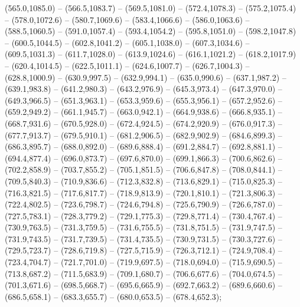 (565.0,1085.0) -- (566.5,1083.7) -- (569.5,1081.0) -- (572.4,1078.3) -- (575.2,1075.4) -- (578.0,1072.6) -- (580.7,1069.6) -- (583.4,1066.6) -- (586.0,1063.6) -- (588.5,1060.5) -- (591.0,1057.4) -- (593.4,1054.2) -- (595.8,1051.0) -- (598.2,1047.8) -- (600.5,1044.5) -- (602.8,1041.2) -- (605.1,1038.0) -- (607.3,1034.6) -- (609.5,1031.3) -- (611.7,1028.0) -- (613.9,1024.6) -- (616.1,1021.2) -- (618.2,1017.9) -- (620.4,1014.5) -- (622.5,1011.1) -- (624.6,1007.7) -- (626.7,1004.3) -- (628.8,1000.9) -- (630.9,997.5) -- (632.9,994.1) -- (635.0,990.6) -- (637.1,987.2) -- (639.1,983.8) -- (641.2,980.3) -- (643.2,976.9) -- (645.3,973.4) -- (647.3,970.0) -- (649.3,966.5) -- (651.3,963.1) -- (653.3,959.6) -- (655.3,956.1) -- (657.2,952.6) -- (659.2,949.2) -- (661.1,945.7) -- (663.0,942.1) -- (664.9,938.6) -- (666.8,935.1) -- (668.7,931.6) -- (670.5,928.0) -- (672.4,924.5) -- (674.2,920.9) -- (676.0,917.3) -- (677.7,913.7) -- (679.5,910.1) -- (681.2,906.5) -- (682.9,902.9) -- (684.6,899.3) -- (686.3,895.7) -- (688.0,892.0) -- (689.6,888.4) -- (691.2,884.7) -- (692.8,881.1) -- (694.4,877.4) -- (696.0,873.7) -- (697.6,870.0) -- (699.1,866.3) -- (700.6,862.6) -- (702.2,858.9) -- (703.7,855.2) -- (705.1,851.5) -- (706.6,847.8) -- (708.0,844.1) -- (709.5,840.3) -- (710.9,836.6) -- (712.3,832.8) -- (713.6,829.1) -- (715.0,825.3) -- (716.3,821.5) -- (717.6,817.7) -- (718.9,813.9) -- (720.1,810.1) -- (721.3,806.3) -- (722.4,802.5) -- (723.6,798.7) -- (724.6,794.8) -- (725.6,790.9) -- (726.6,787.0) -- (727.5,783.1) -- (728.3,779.2) -- (729.1,775.3) -- (729.8,771.4) -- (730.4,767.4) -- (730.9,763.5) -- (731.3,759.5) -- (731.6,755.5) -- (731.8,751.5) -- (731.9,747.5) -- (731.9,743.5) -- (731.7,739.5) -- (731.4,735.5) -- (730.9,731.5) -- (730.3,727.6) -- (729.5,723.7) -- (728.6,719.8) -- (727.5,715.9) -- (726.3,712.1) -- (724.9,708.4) -- (723.4,704.7) -- (721.7,701.0) -- (719.9,697.5) -- (718.0,694.0) -- (715.9,690.5) -- (713.8,687.2) -- (711.5,683.9) -- (709.1,680.7) -- (706.6,677.6) -- (704.0,674.5) -- (701.3,671.6) -- (698.5,668.7) -- (695.6,665.9) -- (692.7,663.2) -- (689.6,660.6) -- (686.5,658.1) -- (683.3,655.7) -- (680.0,653.5) -- (678.4,652.3);
